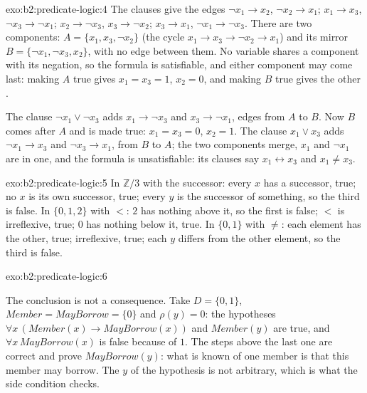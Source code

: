 \begin{solution}{exo:b2:predicate-logic:4}
The clauses give the edges $\neg x_1 \to x_2$, $\neg x_2 \to x_1$; $x_1 \to x_3$, $\neg x_3 \to \neg x_1$; $x_2 \to \neg
x_3$, $x_3 \to \neg x_2$; $x_3 \to x_1$, $\neg x_1 \to \neg x_3$. There are two components: $A = \{x_1, x_3, \neg x_2\}$
(the cycle $x_1 \to x_3 \to \neg x_2 \to x_1$) and its mirror $B = \{\neg x_1, \neg x_3, x_2\}$, with no edge between
them. No variable shares a component with its negation, so the formula is satisfiable, and either component may come
last: making $A$ true gives $x_1 = x_3 = 1$, $x_2 = 0$, and making $B$ true gives the other .

The clause $\neg x_1 \vee \neg x_3$ adds $x_1 \to \neg x_3$ and $x_3 \to \neg x_1$, edges from $A$ to $B$. Now $B$ comes
after $A$ and is made true: $x_1 = x_3 = 0$, $x_2 = 1$. The clause $x_1 \vee x_3$ adds $\neg x_1 \to x_3$ and $\neg x_3
\to x_1$, from $B$ to $A$; the two components merge, $x_1$ and $\neg x_1$ are in one, and the formula is unsatisfiable:
its clauses say $x_1 \leftrightarrow x_3$ and $x_1 \neq x_3$.

\end{solution}

\begin{solution}{exo:b2:predicate-logic:5}
In $\mathbb{Z}/3$ with the successor: every $x$ has a successor, true; no $x$ is its own successor, true; every $y$ is
the successor of something, so the third is false. In $\{0, 1, 2\}$ with $<$: $2$ has nothing above it, so the first
is false; $<$ is irreflexive, true; $0$ has nothing below it, true. In $\{0, 1\}$ with $\neq$: each element has the
other, true; irreflexive, true; each $y$ differs from the other element, so the third is false.

\end{solution}

\begin{solution}{exo:b2:predicate-logic:6}

The conclusion is not a consequence. Take $D = \{0, 1\}$, $\mathit{Member} = \mathit{MayBorrow} = \{0\}$ and $\rho(y) =
0$: the hypotheses $\forall x\, (\mathit{Member}(x) \to \mathit{MayBorrow}(x))$ and $\mathit{Member}(y)$ are true, and
$\forall x\, \mathit{MayBorrow}(x)$ is false because of $1$. The steps above the last one are correct and prove
$\mathit{MayBorrow}(y)$: what is known of one member is that this member may borrow. The $y$ of the hypothesis is not
arbitrary, which is what the side condition checks.
\end{solution}

